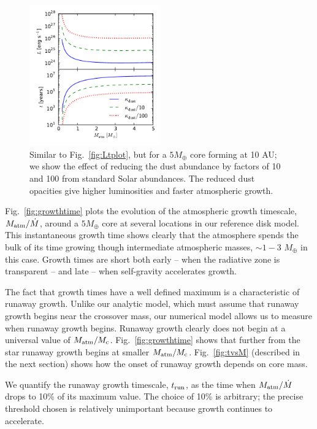 \documentclass[apj, numberedappendix]{emulateapj}
\newcommand{\Fig}[1]{Fig.~\ref{#1}}
\newcommand{\co}{_{\rm c}}
\begin{document}
\begin{figure}[tb]
\centering
\includegraphics[width=0.5\textwidth]{../../figs/ModelAtmospheres/RadSelfGravPoly/PaperFigs/opacity_effect.pdf}
\caption{Similar to \Fig{fig:Ltplot}, but for a $5 M_{\oplus}$ core forming at 10 AU; we show the effect of reducing the dust abundance by factors of 10 and 100 from standard Solar abundances. The reduced dust opacities give higher luminosities and faster atmospheric growth.}  %
\label{fig:LtvsMopacity}
\end{figure}

\Fig{fig:growthtime} plots the evolution of the atmospheric growth timescale, $M_{\rm atm}/\dot{M}$,  around a $5 M_{\oplus}$ core at several locations in our reference disk model.  This instantaneous growth time shows clearly that the atmosphere spends the bulk of its time growing though intermediate atmospheric masses, $\sim 1 -3$ $M_\oplus$ in this case.  Growth times are short both early -- when the radiative zone is transparent -- and late -- when self-gravity accelerates growth.  

The fact that growth times have a well defined maximum is a characteristic of runaway growth.  Unlike our analytic model, which must assume that runaway growth begins near the crossover mass, our numerical model allows us to measure when runaway growth begins.  Runaway growth clearly does not begin at a universal value of $M_{\rm atm}/M\co$.  \Fig{fig:growthtime} shows that further from the star runaway growth begins at smaller $M_{\rm atm}/M\co$.  \Fig{fig:tvsM} (described in the next section) shows how the onset of runaway growth depends on core mass. 

We quantify the runaway growth timescale, $t_{\rm run}$, as the time when $M_{\rm atm}/\dot{M}$ drops to 10\% of its maximum value.  The choice of 10\% is arbitrary; the precise threshold chosen is relatively unimportant because growth continues to accelerate.
\end{document}
